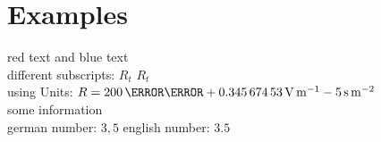 \documentclass[	%
		fontsize=11pt,  %
		a4paper,	    %
		twoside,		%
		english,		%
		sans,			%
		f1				%
	]{HsH-report}		%
\begin{document}

\maketitle[c]			%
\declarationAuthorship

\begin{abstract}
	\lipsum[5-8]
\end{abstract}

\tableofcontents

\cleardoublepage %

\chapter{Examples}
	\label{chap: one}
	{\color{red}red text} and {\color{blue}blue text} \\
	different subscripts: \normalsubscripts$R_t$ \upsubscripts$R_t$ \\
	using Units: $R=200\,\milli\ohm + \SI{0.34567453}{\volt\per\metre} - 5\,\si{\second\per\metre\squared}$ \\
	some information\cite{laboranleitung:physik}\\
	german number: $3,5$ english number: $3.5$\\ %
\end{document}
